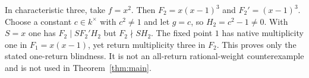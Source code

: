 \begin{example}
In characteristic three, take $f=x^2$. Then
$F_2=x(x-1)^3$ and $F_2'=(x-1)^3$. Choose a constant
$c\in k^\times$ with $c^2\ne1$ and let $g=c$, so
$H_2=c^2-1\ne0$. With $S=x$ one has
$F_2\mid SF_2'H_2$ but $F_2\nmid SH_2$.
The fixed point $1$ has native multiplicity one in $F_1=x(x-1)$,
yet return multiplicity three in $F_2$. This proves only the
stated one-return blindness. It is not an all-return rational-weight
counterexample and is not used in Theorem~\ref{thm:main}.
\end{example}
